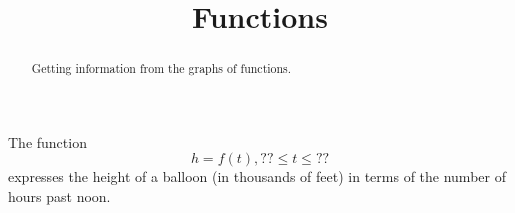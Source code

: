 \documentclass{ximera}
\title{Functions}
\begin{document}
\begin{abstract}
Getting information from the graphs of functions.
\end{abstract}
\maketitle

The function
\[
   h = f(t) , ?? \leq t \leq ??
\]
expresses the height of a balloon (in thousands of feet) in terms of the number of hours past noon.
\end{document}
